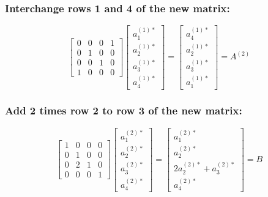 \documentclass[fleqn]{article}
\begin{document}
\subsubsection*{Interchange rows 1 and 4 of the new matrix:}
\begin{equation*}
    \begin{bmatrix}0&0&0&1\\0&1&0&0\\0&0&1&0\\1&0&0&0\end{bmatrix}\begin{bmatrix}a^{(1)*}_1\\a^{(1)*}_2\\a^{(1)*}_3\\a^{(1)*}_4\end{bmatrix} = \begin{bmatrix}a^{(1)*}_4\\a^{(1)*}_2\\a^{(1)*}_3\\a^{(1)*}_1\end{bmatrix} = A^{(2)}
\end{equation*}
\subsubsection*{Add 2 times row 2 to row 3 of the new matrix:}
\begin{equation*}
    \begin{bmatrix}1&0&0&0\\0&1&0&0\\0&2&1&0\\0&0&0&1\end{bmatrix}\begin{bmatrix}a^{(2)*}_1\\a^{(2)*}_2\\a^{(2)*}_3\\a^{(2)*}_4\end{bmatrix} = \begin{bmatrix}a^{(2)*}_1\\a^{(2)*}_2\\2a^{(2)*}_2+a^{(2)*}_3\\a^{(2)*}_4\end{bmatrix} = B
\end{equation*}
\end{document}
